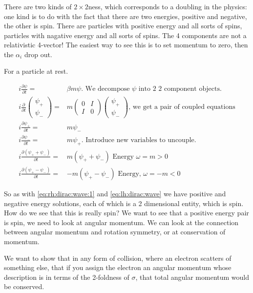 \documentclass[]{article}
\begin{document}
There are two kinds of $2\times2$ness, which corresponds to a doubling in the physics: one kind is to do with the fact that there are two energies, positive and negative, the other is spin. There are particles with positive energy and all sorts of spins, particles with nagative energy and all sorts of spins.
The 4 components are not a relativistic 4-vector! The easiest way to see this is to set momentum to zero, then the $\alpha_i$ drop out.

For a particle at rest.

\begin{align*}
	i \frac{\partial \psi}{\partial t} =&  \beta m \psi \text{. We decompose $\psi$ into 2 2 component objects.}\\
	i \frac{\partial}{\partial t}\begin{pmatrix}
		\psi_+\\
		\psi_-
	\end{pmatrix}=&m \begin{pmatrix}
		0&I\\
		I&0
	\end{pmatrix}\begin{pmatrix}
		\psi_+\\
		\psi_-
	\end{pmatrix} \text{, we get a pair of coupled equations}\\
	i \frac{\partial \psi_+}{\partial t} =&   m \psi_-\\
	i \frac{\partial \psi_-}{\partial t} =&   m \psi_+ \text{. Introduce new variables to uncouple.}\\
	i \frac{\partial (\psi_++\psi_-)}{\partial t} =&   m (\psi_++\psi_-) \text{ Energy $\omega=m>0$}\\
	i \frac{\partial (\psi_+-\psi_-)}{\partial t} =&   -m (\psi_+-\psi_-) \text{ Energy, $\omega=-m<0$}
\end{align*}

So as with \eqref{eq:rh:dirac:wave:1} and \eqref{eq:lh:dirac:wave} we have positive and negative energy solutions, each of which is a 2 dimensional entity, which is spin. How do we see that this is really spin? We want to see that a positive energy pair is spin, we need to look at angular momentum. We can look at the connection between angular momentum and rotation symmetry, or at conservation of momentum.

We want to show that in any form of collision, where an electron scatters of something else, that if you assign the electron an angular momentum whose description is in terms of the 2-foldness of $\sigma$, that total angular momentum would be conserved.
\end{document}
